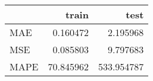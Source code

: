 \begin{tabular}{lrr}
\toprule
{} &      train &        test \\
\midrule
MAE  &   0.160472 &    2.195968 \\
MSE  &   0.085803 &    9.797683 \\
MAPE &  70.845962 &  533.954787 \\
\bottomrule
\end{tabular}

